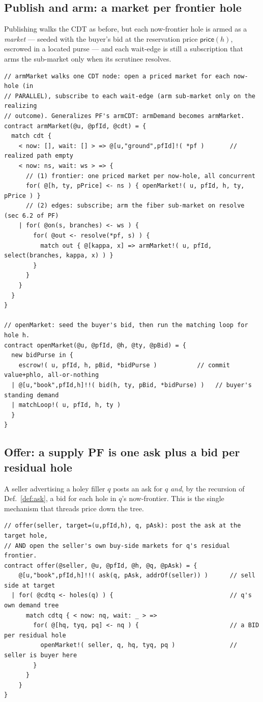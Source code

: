 \documentclass[11pt]{article}
\theoremstyle{definition}
\newcommand{\PF}{\textsf{PF}}
\newcommand{\CDT}{\textsf{CDT}}
\newcommand{\price}{\ensuremath{\mathsf{price}}}
\begin{document}
\subsection{Publish and arm: a market per frontier hole}
Publishing walks the \CDT{} as before, but each now-frontier hole is armed as a \emph{market} ---
seeded with the buyer's bid at the reservation price $\price(h)$, escrowed in a located purse --- and
each wait-edge is still a subscription that arms the sub-market only when its scrutinee resolves.

\begin{lstlisting}
// armMarket walks one CDT node: open a priced market for each now-hole (in
// PARALLEL), subscribe to each wait-edge (arm sub-market only on the realizing
// outcome). Generalizes PF's armCDT: armDemand becomes armMarket.
contract armMarket(@u, @pfId, @cdt) = {
  match cdt {
    < now: [], wait: [] > => @[u,"ground",pfId]!( *pf )       // realized path empty
    < now: ns, wait: ws > => {
      // (1) frontier: one priced market per now-hole, all concurrent
      for( @[h, ty, pPrice] <- ns ) { openMarket!( u, pfId, h, ty, pPrice ) }
      // (2) edges: subscribe; arm the fiber sub-market on resolve (sec 6.2 of PF)
    | for( @on(s, branches) <- ws ) {
        for( @out <- resolve(*pf, s) ) {
          match out { @[kappa, x] => armMarket!( u, pfId, select(branches, kappa, x) ) }
        }
      }
    }
  }
}

// openMarket: seed the buyer's bid, then run the matching loop for hole h.
contract openMarket(@u, @pfId, @h, @ty, @pBid) = {
  new bidPurse in {
    escrow!( u, pfId, h, pBid, *bidPurse )           // commit value+phlo, all-or-nothing
  | @[u,"book",pfId,h]!!( bid(h, ty, pBid, *bidPurse) )   // buyer's standing demand
  | matchLoop!( u, pfId, h, ty )
  }
}
\end{lstlisting}

\subsection{Offer: a supply \PF{} is one ask plus a bid per residual hole}
A seller advertising a holey filler $q$ posts an ask for $q$ \emph{and}, by the recursion of
Def.~\ref{def:ask}, a bid for each hole in $q$'s now-frontier. This is the single mechanism that
threads price down the tree.

\begin{lstlisting}
// offer(seller, target=(u,pfId,h), q, pAsk): post the ask at the target hole,
// AND open the seller's own buy-side markets for q's residual frontier.
contract offer(@seller, @u, @pfId, @h, @q, @pAsk) = {
    @[u,"book",pfId,h]!!( ask(q, pAsk, addrOf(seller)) )      // sell side at target
  | for( @cdtq <- holes(q) ) {                                // q's own demand tree
      match cdtq { < now: nq, wait: _ > =>
        for( @[hq, tyq, pq] <- nq ) {                         // a BID per residual hole
          openMarket!( seller, q, hq, tyq, pq )               // seller is buyer here
        }
      }
    }
}
\end{lstlisting}
\end{document}
